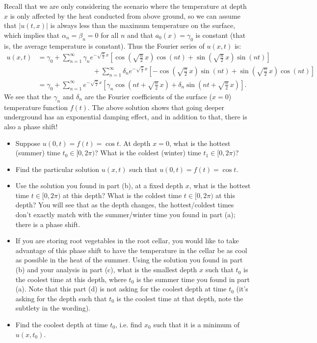 \documentclass[11pt]{article}
\theoremstyle{definition}
\begin{document}
\begin{enumerate}[leftmargin=*]
Recall that we are only considering the scenario where the temperature at depth $x$ is only affected by the heat conducted from above ground, so we can assume that $|u(t,x)|$ is always less than the maximum temperature on the surface, which implies that $\alpha_{n}=\beta_{n}=0$ for all $n$ and that $a_{0}(x)=\gamma_{0}$ is constant (that is, the average temperature is constant). Thus the Fourier series of $u(x,t)$ is:
\begin{align*}
	u(x,t)
	&=\gamma_{0}+\sum_{n=1}^{\infty}\gamma_{n}e^{-\sqrt{\frac{n}{2}}\,x}\left[\cos(\sqrt{\tfrac{n}{2}}\,x)\cos(nt)+\sin(\sqrt{\tfrac{n}{2}}\,x)\sin(nt)\right]\\
	&\qquad\qquad\qquad\qquad+\sum_{n=1}^{\infty}\delta_{n}e^{-\sqrt{\frac{n}{2}}\,x}\left[-\cos(\sqrt{\tfrac{n}{2}}\,x)\sin(nt)+\sin(\sqrt{\tfrac{n}{2}}\,x)\cos(nt)\right]\\
	&=\gamma_{0}+\sum_{n=1}^{\infty}e^{-\sqrt{\frac{n}{2}}\,x}\left[\gamma_{n}\cos\left(nt+\sqrt{\tfrac{n}{2}}\,x\right)+\delta_{n}\sin\left(nt+\sqrt{\tfrac{n}{2}}\,x\right)\right].
\end{align*}
We see that the $\gamma_{n}$ and $\delta_{n}$ are the Fourier coefficients of the surface ($x=0$) temperature function $f(t)$.  The above solution shows that going deeper underground has an exponential damping effect, and in addition to that, there is also a phase shift!

\begin{itemize}
\item [(a)] Suppose $u(0,t)=f(t)=\cos t$.  At depth $x=0$, what is the hottest (summer) time  $t_0 \in [0,2\pi)$? What is the coldest (winter) time $t_1 \in [0, 2\pi)$?
\item [(b)]  Find the particular solution $u(x,t)$ such that $u(0,t)=f(t)=\cos t$.  
\item [(c)]  Use the solution you found in part (b), at a fixed depth $x$, what is the hottest time $t\in [0, 2\pi)$ at this depth?  What is the coldest time $t\in [0, 2\pi)$ at this depth?  You will see that as the depth changes, the hottest/coldest times don't exactly match with the summer/winter time you found in part (a); there is a phase shift. 
\item [(d)]  If you are storing root vegetables in the root cellar, you would like to take advantage of this phase shift to have the temperature in the cellar be as cool as possible in the heat of the summer.  Using the solution you found in part (b) and your analysis in part (c), what is the smallest depth $x$ such that $t_0$ is the coolest time at this depth, where $t_0$ is the summer time you found in part (a).  Note that this part (d) is not asking for the coolest depth at time $t_0$ (it's asking for the depth such that $t_0$ is the coolest time at that depth, note the subtlety in the wording). 
\item [(e)]  Find the coolest depth at time $t_0$, i.e. find $x_0$ such that it is a minimum of $u(x,t_0)$.
\end{itemize}

\end{enumerate}
\end{document}
